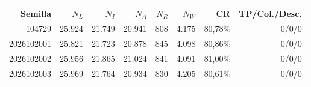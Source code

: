 \begin{tabular}{@{}rrrrrrrr@{}}\hline
Semilla & $N_L$ & $N_I$ & $N_A$ & $N_R$ & $N_W$ & CR & TP/Col./Desc. \\ \hline
104729 & 25.924 & 21.749 & 20.941 & 808 & 4.175 & 80,78\% & 0/0/0 \\ 
2026102001 & 25.821 & 21.723 & 20.878 & 845 & 4.098 & 80,86\% & 0/0/0 \\ 
2026102002 & 25.956 & 21.865 & 21.024 & 841 & 4.091 & 81,00\% & 0/0/0 \\ 
2026102003 & 25.969 & 21.764 & 20.934 & 830 & 4.205 & 80,61\% & 0/0/0 \\ 
\hline\end{tabular}
